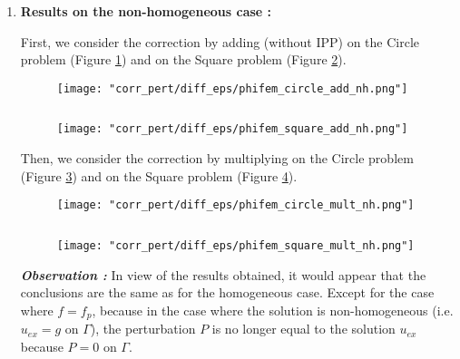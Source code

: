 \begin{enumerate}[label=\textbullet]
	\item \textbf{Results on the non-homogeneous case :}
	
	First, we consider the correction by adding (without IPP) on the Circle problem (Figure \ref{corr_pert_phifem_circle_add_nh}) and on the Square problem (Figure \ref{corr_pert_phifem_square_add_nh}).
	
	\begin{minipage}{0.48\linewidth}
		\begin{figure}[H]
			\centering
			\texttt{[image: "corr\_pert/diff\_eps/phifem\_circle\_add\_nh.png"]}
			\label{corr_pert_phifem_circle_add_nh}
		\end{figure} 
	\end{minipage} $\qquad$
	\begin{minipage}{0.48\linewidth}
		\begin{figure}[H]
			\centering
			\texttt{[image: "corr\_pert/diff\_eps/phifem\_square\_add\_nh.png"]}
			\label{corr_pert_phifem_square_add_nh}
		\end{figure} 
	\end{minipage}
	
	Then, we consider the correction by multiplying on the Circle problem (Figure \ref{corr_pert_phifem_circle_mult_nh}) and on the Square problem (Figure \ref{corr_pert_phifem_square_mult_nh}).
	
	\begin{minipage}{0.48\linewidth}
		\begin{figure}[H]
			\centering
			\texttt{[image: "corr\_pert/diff\_eps/phifem\_circle\_mult\_nh.png"]}
			\label{corr_pert_phifem_circle_mult_nh}
		\end{figure} 
	\end{minipage} $\qquad$
	\begin{minipage}{0.48\linewidth}
		\begin{figure}[H]
			\centering
			\texttt{[image: "corr\_pert/diff\_eps/phifem\_square\_mult\_nh.png"]}
			\label{corr_pert_phifem_square_mult_nh}
		\end{figure} 
	\end{minipage}
	
	\textbf{\textit{Observation :}} In view of the results obtained, it would appear that the conclusions are the same as for the homogeneous case. Except for the case where $f=f_p$, because in the case where the solution is non-homogeneous (i.e. $u_{ex}=g$ on $\Gamma$), the perturbation $P$ is no longer equal to the solution $u_{ex}$ because $P=0$ on $\Gamma$.
\end{enumerate}


